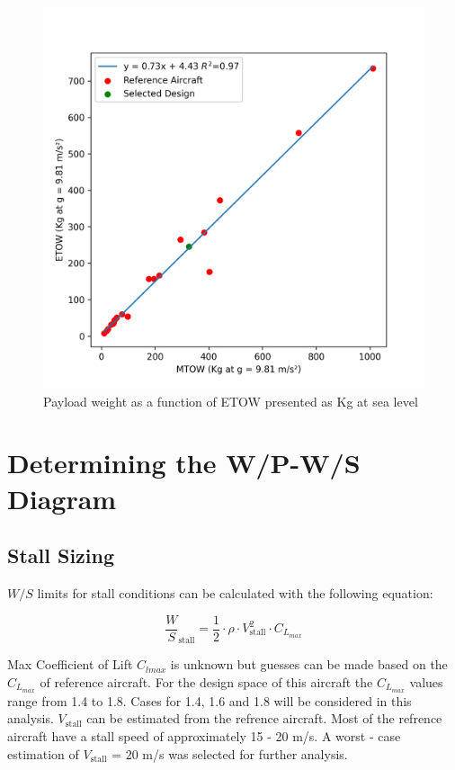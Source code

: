 \documentclass[12pt]{article}
\begin{document}
	\begin{figure}[h!]
		\centering
		\includegraphics[width=6in]{Figures/MTOW_vs_ETOW.png} %
		\caption{Payload weight as a function of ETOW presented as Kg at sea level}
		\label{fig:ETOWMTOW}
	\end{figure}
	
	\newpage

	\section{Determining the W/P-W/S Diagram}
	\subsection{Stall Sizing}
	$W/S$ limits for stall conditions can be calculated with the following equation:
	
	\begin{equation}
		\frac{W}{S}_{\text{stall}} = \frac{1}{2} \cdot \rho \cdot V_{\text{stall}}^2 \cdot C_{L_{max}}
	\end{equation}
	
	Max Coefficient of Lift $C_{lmax}$ is unknown but guesses can be made based on the $C_{L_{max}}$ of reference aircraft. For the design space of this aircraft the $C_{L_{max}}$ values range from 1.4 to 1.8. Cases for 1.4, 1.6 and 1.8 will be considered in this analysis. $V_{\text{stall}}$ can be estimated from the refrence aircraft. Most of the refrence aircraft have a stall speed of approximately 15 - 20 m/s. A worst - case estimation of  $V_{\text{stall}}$ = 20 m/s was selected for further analysis. 
	
\end{document}
